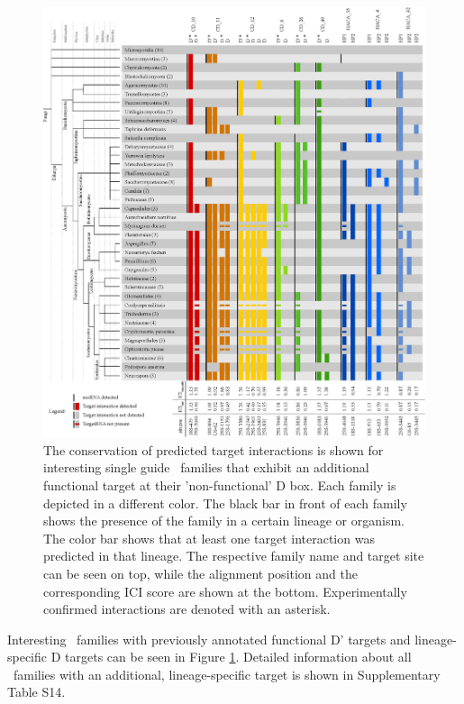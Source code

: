 \begin{figure}
  \centering
  \includegraphics[width=\textwidth]{pics/conservation_lineage_specific_targets.eps}
  \caption{The conservation of predicted target interactions is shown
    for interesting single guide \cd\ families that exhibit an
    additional functional target at their 'non-functional' D box. Each
    family is depicted in a different color. The black bar in front of
    each family shows the presence of the family in a certain lineage
    or organism. The color bar shows that at least one target
    interaction was predicted in that lineage. The respective family
    name and target site can be seen on top, while the alignment
    position and the corresponding ICI score are shown at the
    bottom. Experimentally confirmed interactions are denoted with
    an asterisk.}
  \label{fig:additional_targets}
\end{figure}

Interesting \cd\ families with previously annotated functional D'
targets and lineage-specific D targets can be seen in Figure
\ref{fig:additional_targets}. Detailed information about all \sno\
families with an additional, lineage-specific target is shown in
Supplementary Table S14.

